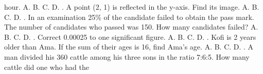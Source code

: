 \documentclass{article}
\begin{document}
\begin{multicols}{2}
hour. \newline \indent A. \newline \indent B. \newline \indent C. \newline \indent D.  \newline{}. A point (2, 1) is reflected in the y-axis. Find its image. \newline \indent A. \newline \indent B. \newline \indent C. \newline \indent D.  \newline{}. In an examination 25\% of the candidate failed to obtain the pass mark. The number of candidates who passed was 150. How many candidates failed? \newline \indent A. \newline \indent B. \newline \indent C. \newline \indent D.  \newline{}. Correct 0.00025 to one significant figure. \newline \indent A. \newline \indent B. \newline \indent C. \newline \indent D.  \newline{}. Kofi is 2 years older than Ama. If the sum of their ages is 16, find Ama's age. \newline \indent A. \newline \indent B. \newline \indent C. \newline \indent D.  \newline{}. A man divided his 360 cattle among his three sons in the ratio 7:6:5. How many cattle did one who had the 
\end{multicols}
\end{document}
